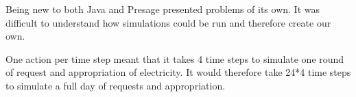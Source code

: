 Being new to both Java and Presage presented problems of its own. It was difficult to understand how simulations could be run and therefore create our own.

One action per time step meant that it takes 4 time steps to simulate one round of request and appropriation of electricity. It would therefore take 24*4 time steps to simulate a full day of requests and appropriation.
